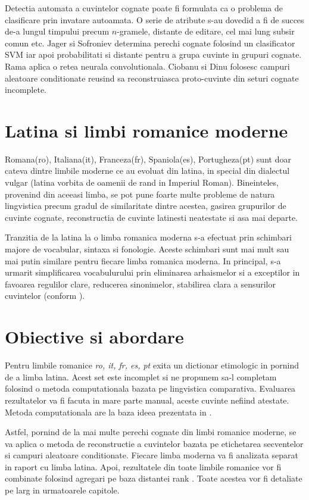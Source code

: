 Detectia automata a cuvintelor cognate poate fi formulata ca o problema de clasificare prin invatare
autoamata. O serie de atribute s-au dovedid a fi de succes de-a lungul timpului precum $n$-gramele,
distante de editare, cel mai lung subsir comun etc. Jager si Sofroniev \cite{svmclass} determina
perechi cognate folosind un clasificator SVM iar apoi probabilitati si distante pentru a grupa
cuvinte in grupuri cognate. Rama \cite{cnn} aplica o retea neurala convolutionala. Ciobanu si Dinu
\cite{theone} folosesc campuri aleatoare conditionate reusind sa reconstruiasca proto-cuvinte din
seturi cognate incomplete.

\section{Latina si limbi romanice moderne}
Romana(ro), Italiana(it), Franceza(fr), Spaniola(es), Portugheza(pt) sunt doar cateva dintre limbile
moderne ce au evoluat din latina, in special din dialectul vulgar (latina vorbita de oamenii de rand 
in Imperiul Roman). Bineinteles, provenind din aceeasi limba, se pot pune foarte multe probleme de 
natura lingvistica precum gradul de similaritate dintre acestea, gasirea grupurilor de cuvinte cognate,
reconstructia de cuvinte latinesti neatestate si asa mai departe.

Tranzitia de la latina la o limba romanica moderna s-a efectuat prin schimbari majore de vocabular, 
sintaxa si fonologie. Aceste schimbari sunt mai mult sau mai putin similare pentru fiecare limba
romanica moderna. In principal, s-a urmarit simplificarea vocabulurului prin eliminarea arhaismelor
si a exceptilor in favoarea regulilor clare, reducerea sinonimelor, stabilirea clara a sensurilor
cuvintelor (conform \cite{sala}).

\section{Obiective si abordare}
Pentru limbile romanice \textit{ro, it, fr, es, pt} exita un dictionar etimologic in \cite{ripeanubook}
pornind de a limba latina. Acest set este incomplet si ne propunem sa-l completam folosind o metoda 
computationala bazata pe lingvistica comparativa. Evaluarea rezultatelor va fi facuta in mare parte
manual, aceste cuvinte nefiind atestate. Metoda computationala are la baza ideea prezentata in 
\cite{theone}.

Astfel, pornind de la mai multe perechi cognate din limbi romanice moderne, se va aplica o metoda 
de reconstructie a cuvintelor bazata pe etichetarea secventelor si campuri aleatoare conditionate. 
Fiecare limba moderna va fi analizata separat in raport cu limba latina. Apoi, rezultatele din toate 
limbile romanice vor fi combinate folosind agregari pe baza distantei rank \cite{rankdistance}.
Toate acestea vor fi detaliate pe larg in urmatoarele capitole.
